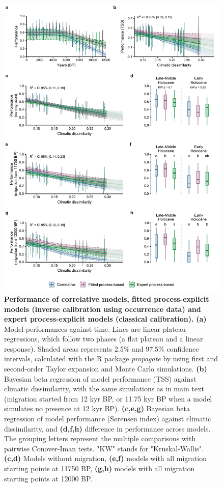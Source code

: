 \vspace*{-0.5in}
\begin{figure}
\centering
\includegraphics[width=0.9\linewidth]{chapter2/figs/supp/figS10_past_performance_summary-1.pdf}
\caption{\textbf{Performance of correlative models, fitted process-explicit models (inverse calibration using occurrence data) and expert process-explicit models (classical calibration).}
\textbf{(a)} Model performances against time. Lines are linear-plateau regressions, which follow two phases (a flat plateau and a linear response). Shaded areas represents 2.5\% and 97.5\% confidence intervals, calculated with the R package \emph{propagate} \cite{Spiess2018} by using  first and second-order Taylor expansion and Monte Carlo simulations. \textbf{(b)} Bayesian beta regression of model performance (TSS) against climatic dissimilarity, with the same simulations as in main text (migration started from 12 kyr BP, or 11.75 kyr BP when a model simulates no presence at 12 kyr BP). \textbf{(c,e,g)} Bayesian beta regression of model performance (Sørensen index) against climatic dissimilarity, and \textbf{(d,f,h)} difference in performance across models. The grouping letters represent the multiple comparisons with pairwise Conover-Iman tests. "KW" stands for "Kruskal-Wallis".
\textbf{(c,d)} Models without migration, \textbf{(e,f)} models with all migration starting points at 11750 BP, \textbf{(g,h)} models with all migration starting points at 12000 BP.}
\label{fig:S10}
\end{figure}